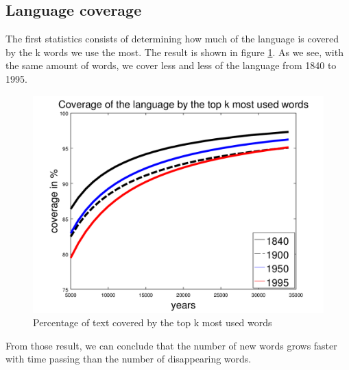 \subsection{Language coverage}

The first statistics consists of determining how much of the language is covered by the k words we use the most. The result is shown in figure \ref{coverage_figure}. As we see, with the same amount of words, we cover less and less of the language from 1840 to 1995.

\begin{figure}[H]
	\centering
    \includegraphics[scale=0.50]{Pictures/statistics/top-k-words-coverage/coverage.png}
    \caption{Percentage of text covered by the top k most used words}
    \label{coverage_figure}
\end{figure}

From those result, we can conclude that the number of new words grows faster with time passing than the number of disappearing words.